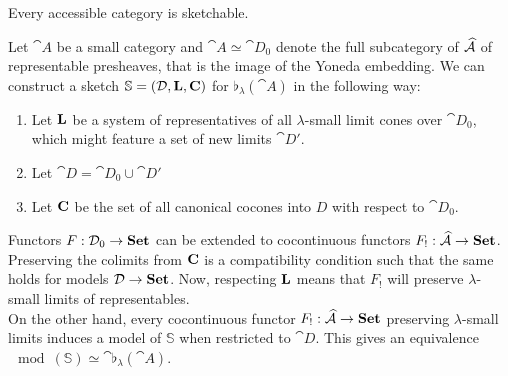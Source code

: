 \begin{Theorem}
Every accessible category is sketchable.
\end{Theorem}
\begin{Proof}
Let $\cat A$ be a small category and $\cat A \simeq \cat D_0$ denote the full subcategory of $\widehat{\mathcal{A}}$ of representable presheaves, that is the image of the Yoneda embedding. We can construct a sketch $\mathbb S = (\mathcal{D}, \textbf{L}, \textbf{C})$ for $\flat_\lambda(\cat A)$ in the following way:

\begin{enumerate}
\item Let $\textbf{L}$ be a system of representatives of all $\lambda$-small limit cones over $\cat D_0$, which might feature a set of new limits $\cat D'$.
\item Let $\cat D = \cat D_0 \cup \cat D'$
\item Let $\textbf{C}$ be the set of all canonical cocones into $D$ with respect to $\cat D_0$.
\end{enumerate}

Functors $F : \mathcal{D}_0 \to \mathbf{Set}$ can be extended to cocontinuous functors $F_! : \widehat{\mathcal{A}} \to \mathbf{Set}$. Preserving the colimits from $\textbf{C}$ is a compatibility condition such that the same holds for models $\mathcal{D} \to \mathbf{Set}$. Now, respecting $\textbf{L}$ means that $F_!$ will preserve $\lambda$-small limits of representables. \\

On the other hand, every cocontinuous functor $F_! : \widehat{\mathcal{A}} \to \mathbf{Set}$ preserving $\lambda$-small limits induces a model of $\mathbb S$ when restricted to $\cat D$. This gives an equivalence $\mod(\mathbb S) \simeq \cat \flat_\lambda(\cat A)$.
\end{Proof}

